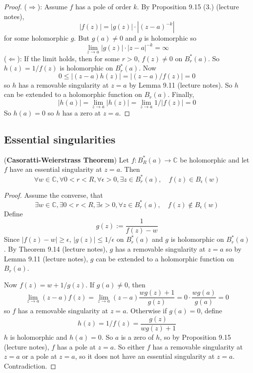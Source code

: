 \begin{proof}
	($\Rightarrow$): Assume $f$ has a pole of order $k$. By Proposition 9.15 (3.) (lecture notes),
	\[
		|f(z)| = |g(z)| \cdot |{(z - a)}^{-k}|
	\]
	for some holomorphic $g$. But $g(a) \ne 0$ and $g$ is holomorphic so
	\[
		\lim_{z \to a} |g(z)| \cdot |z - a|^{-k} = \infty
	\]
	($\Leftarrow$): If the limit holds, then for some $r > 0$, $f(z) \ne 0$ on $B_r^*(a)$. So $h(z) = 1 / f(z)$ is holomorphic on $B_r^*(a)$. Now
	\[
		0 \le |(z - a) h(z)| = |(z - a) / f(z)| = 0
	\]
	so $h$ has a removable singularity at $z = a$ by Lemma 9.11 (lecture notes). So $h$ can be extended to a holomorphic function on $B_r(a)$. Finally,
	\[
		|h(a)| = \lim_{z \to a} |h(z)| = \lim_{z \to a} 1 / |f(z)| = 0
	\]
	So $h(a) = 0$ so $h$ has a zero at $z = a$.
\end{proof}

\subsection{Essential singularities}

\begin{theorem}
	(\textbf{Casoratti-Weierstrass Theorem}) Let $f: B_R^*(a) \to \mathbb{C}$ be holomorphic and let $f$ have an essential singularity at $z = a$. Then
	\[
		\forall w \in \mathbb{C}, \forall 0 < r < R, \forall \epsilon > 0, \exists z \in B_r^*(a), \quad f(z) \in B_{\epsilon}(w)
	\]
\end{theorem}

\begin{proof}
	Assume the converse, that
	\[
		\exists w \in \mathbb{C}, \exists 0 < r < R, \exists \epsilon > 0, \forall z \in B_r^*(a), \quad f(z) \notin B_{\epsilon}(w)
	\]
	Define
	\[
		g(z) := \frac{1}{f(z) - w}
	\]
	Since $|f(z) - w| \ge \epsilon$, $|g(z)| \le 1 / \epsilon$ on $B_r^*(a)$ and $g$ is holomorphic on $B_r^*(a)$. By Theorem 9.14 (lecture notes), $g$ has a removable singularity at $z = a$ so by Lemma 9.11 (lecture notes), $g$ can be extended to a holomorphic function on $B_r(a)$.
	
	Now $f(z) = w + 1 / g(z)$. If $g(a) \ne 0$, then
	\[
		\lim_{z \to a} (z - a) f(z) = \lim_{z \to a} (z - a) \frac{w g(z) + 1}{g(z)} = 0 \cdot \frac{w g(a)}{g(a)} = 0
	\]
	so $f$ has a removable singularity at $z = a$. Otherwise if $g(a) = 0$, define
	\[
		h(z) = 1 / f(z) = \frac{g(z)}{w g(z) + 1}
	\]
	$h$ is holomorphic and $h(a) = 0$. So $a$ is a zero of $h$, so by Proposition 9.15 (lecture notes), $f$ has a pole at $z = a$. So either $f$ has a removable singularity at $z = a$ or a pole at $z = a$, so it does not have an essential singularity at $z = a$. Contradiction.
\end{proof}

